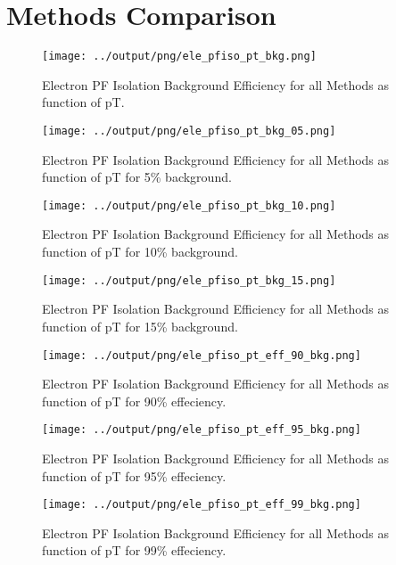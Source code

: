 \documentclass[11pt]{book}
\begin{document}
\section{Methods Comparison}
\begin{figure}[htb]
\centering
\texttt{[image: ../output/png/ele\_pfiso\_pt\_bkg.png]}
\caption{Electron PF Isolation Background Efficiency for all Methods as function of pT.}
\label{fig:ele_pfiso_pt_bkg}
\end{figure}

\begin{figure}[htb]
\centering
\texttt{[image: ../output/png/ele\_pfiso\_pt\_bkg\_05.png]}
\caption{Electron PF Isolation Background Efficiency for all Methods as function of pT for 5\% background.}
\label{fig:ele_pfiso_pt_bkg_05}
\end{figure}

\begin{figure}[htb]
\centering
\texttt{[image: ../output/png/ele\_pfiso\_pt\_bkg\_10.png]}
\caption{Electron PF Isolation Background Efficiency for all Methods as function of pT for 10\% background.}
\label{fig:ele_pfiso_pt_bkg_10}
\end{figure}

\begin{figure}[htb]
\centering
\texttt{[image: ../output/png/ele\_pfiso\_pt\_bkg\_15.png]}
\caption{Electron PF Isolation Background Efficiency for all Methods as function of pT for 15\% background.}
\label{fig:ele_pfiso_pt_bkg_15}
\end{figure}

\begin{figure}[htb]
\centering
\texttt{[image: ../output/png/ele\_pfiso\_pt\_eff\_90\_bkg.png]}
\caption{Electron PF Isolation Background Efficiency for all Methods as function of pT for 90\% effeciency.}
\label{fig:ele_pfiso_pt_eff_90_bkg}
\end{figure}

\begin{figure}[htb]
\centering
\texttt{[image: ../output/png/ele\_pfiso\_pt\_eff\_95\_bkg.png]}
\caption{Electron PF Isolation Background Efficiency for all Methods as function of pT for 95\% effeciency.}
\label{fig:ele_pfiso_pt_eff_95_bkg}
\end{figure}

\begin{figure}[htb]
\centering
\texttt{[image: ../output/png/ele\_pfiso\_pt\_eff\_99\_bkg.png]}
\caption{Electron PF Isolation Background Efficiency for all Methods as function of pT for 99\% effeciency.}
\label{fig:ele_pfiso_pt_eff_99_bkg}
\end{figure}
\clearpage
\end{document}
